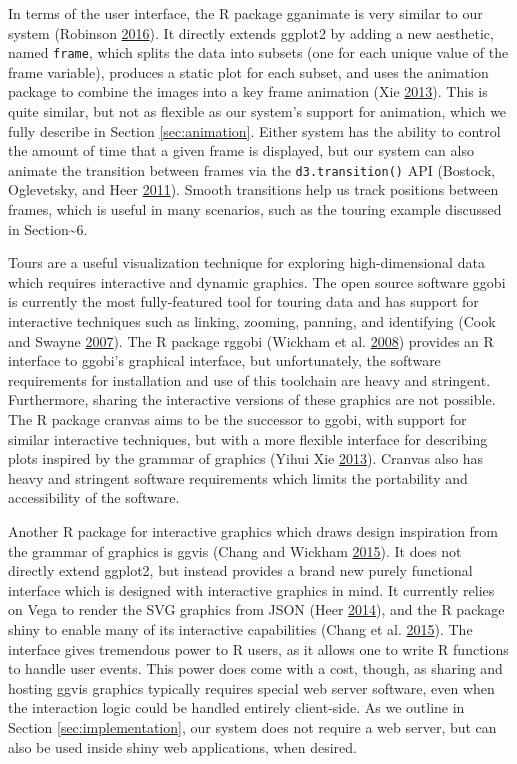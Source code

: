 \documentclass[12pt,]{isuthesis}
\begin{document}
In terms of the user interface, the R package gganimate is very similar
to our system (Robinson \protect\hyperlink{ref-gganimate}{2016}). It
directly extends ggplot2 by adding a new aesthetic, named
\texttt{frame}, which splits the data into subsets (one for each unique
value of the frame variable), produces a static plot for each subset,
and uses the animation package to combine the images into a key frame
animation (Xie \protect\hyperlink{ref-animation}{2013}). This is quite
similar, but not as flexible as our system's support for animation,
which we fully describe in Section \ref{sec:animation}. Either system
has the ability to control the amount of time that a given frame is
displayed, but our system can also animate the transition between frames
via the \texttt{d3.transition()} API (Bostock, Oglevetsky, and Heer
\protect\hyperlink{ref-d3}{2011}). Smooth transitions help us track
positions between frames, which is useful in many scenarios, such as the
touring example discussed in Section\textasciitilde{}6.

Tours are a useful visualization technique for exploring
high-dimensional data which requires interactive and dynamic graphics.
The open source software ggobi is currently the most fully-featured tool
for touring data and has support for interactive techniques such as
linking, zooming, panning, and identifying (Cook and Swayne
\protect\hyperlink{ref-ggobi:2007}{2007}). The R package rggobi (Wickham
et al. \protect\hyperlink{ref-rggobi}{2008}) provides an R interface to
ggobi's graphical interface, but unfortunately, the software
requirements for installation and use of this toolchain are heavy and
stringent. Furthermore, sharing the interactive versions of these
graphics are not possible. The R package cranvas aims to be the
successor to ggobi, with support for similar interactive techniques, but
with a more flexible interface for describing plots inspired by the
grammar of graphics (Yihui Xie \protect\hyperlink{ref-cranvas}{2013}).
Cranvas also has heavy and stringent software requirements which limits
the portability and accessibility of the software.

Another R package for interactive graphics which draws design
inspiration from the grammar of graphics is ggvis (Chang and Wickham
\protect\hyperlink{ref-ggvis}{2015}). It does not directly extend
ggplot2, but instead provides a brand new purely functional interface
which is designed with interactive graphics in mind. It currently relies
on Vega to render the SVG graphics from JSON (Heer
\protect\hyperlink{ref-vega}{2014}), and the R package shiny to enable
many of its interactive capabilities (Chang et al.
\protect\hyperlink{ref-shiny}{2015}). The interface gives tremendous
power to R users, as it allows one to write R functions to handle user
events. This power does come with a cost, though, as sharing and hosting
ggvis graphics typically requires special web server software, even when
the interaction logic could be handled entirely client-side. As we
outline in Section \ref{sec:implementation}, our system does not require
a web server, but can also be used inside shiny web applications, when
desired.
\end{document}
